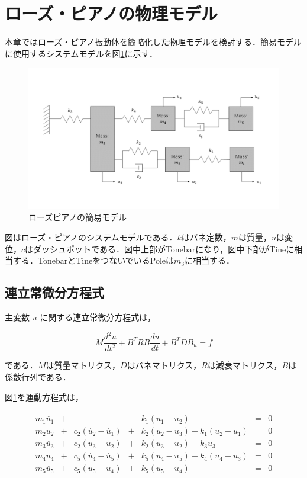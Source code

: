 \section{ローズ・ピアノの物理モデル}

本章ではローズ・ピアノ振動体を簡略化した物理モデルを検討する．簡易モデルに使用するシステムモデルを図\ref{fig:簡易モデル}に示す．

\begin{figure}
    \centering
    \includegraphics[width=15cm]{img/system-model.png}
    \caption{ローズピアノの簡易モデル}
    \label{fig:簡易モデル}
\end{figure}

図はローズ・ピアノのシステムモデルである．$k$はバネ定数，$m$は質量，$u$は変位，$c$はダッシュポットである．図中上部がTonebarになり，図中下部がTineに相当する．TonebarとTineをつないでいるPoleは$m_3$に相当する．



\subsection{連立常微分方程式}

主変数 $u$ に関する連立常微分方程式は，

\begin{equation}
    M \frac{d^2 u}{dt^2} + B^T R B \frac{du}{dt} + B^T D B_u = f    
\end{equation}

である．$M$は質量マトリクス，$D$はバネマトリクス，$R$は減衰マトリクス，$B$は係数行列である．

図\ref{fig:簡易モデル}を運動方程式は，

\begin{eqnarray}
    \begin{matrix}
        m_1 \ddot{u_1} &+&  & & k_1 (u_1 - u_2) &=& 0 \\ 
        m_2 \ddot{u_2} &+& c_2(\dot{u_2} - \dot{u_1}) &+& k_2 (u_2 - u_3) + k_1 (u_2 - u_1) &=& 0 \\ 
        m_3 \ddot{u_3} &+& c_2(\dot{u_3} - \dot{u_2}) &+& k_2 (u_3 - u_2) + k_3 u_3 &=& 0 \\ 
        m_4 \ddot{u_4} &+& c_5(\dot{u_4} - \dot{u_5}) &+& k_5 (u_4 - u_5) + k_4 (u_4 - u_3) &=& 0 \\ 
        m_5 \ddot{u_5} &+& c_5(\dot{u_5} - \dot{u_4}) &+& k_5 (u_5 - u_4) &=& 0
    \end{matrix}        
\end{eqnarray}

